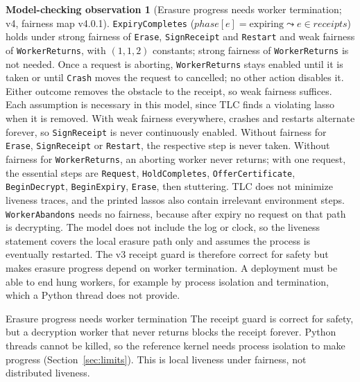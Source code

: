 \documentclass[pdflatex,sn-mathphys-num,twocolumn]{sn-jnl}
\theoremstyle{plain}
\theoremstyle{definition}
\newtheorem{observation}{Model-checking observation}
\newcommand{\code}[1]{\texttt{#1}}
\begin{document}
\begin{observation}[Erasure progress needs worker termination; v4, fairness map v4.0.1]\label{obs:liveness}
\code{ExpiryCompletes} ($\mathit{phase}[e]=\text{expiring}\leadsto e\in\mathit{receipts}$) holds under strong fairness of \code{Erase}, \code{SignReceipt} and \code{Restart} and weak fairness of \code{WorkerReturns}, with $(1,1,2)$ constants; strong fairness of \code{WorkerReturns} is not needed. Once a request is aborting, \code{WorkerReturns} stays enabled until it is taken or until \code{Crash} moves the request to cancelled; no other action disables it. Either outcome removes the obstacle to the receipt, so weak fairness suffices. Each assumption is necessary in this model, since TLC finds a violating lasso when it is removed. With weak fairness everywhere, crashes and restarts alternate forever, so \code{SignReceipt} is never continuously enabled. Without fairness for \code{Erase}, \code{SignReceipt} or \code{Restart}, the respective step is never taken. Without fairness for \code{WorkerReturns}, an aborting worker never returns; with one request, the essential steps are \code{Request}, \code{HoldCompletes}, \code{OfferCertificate}, \code{BeginDecrypt}, \code{BeginExpiry}, \code{Erase}, then stuttering. TLC does not minimize liveness traces, and the printed lassos also contain irrelevant environment steps. \code{WorkerAbandons} needs no fairness, because after expiry no request on that path is decrypting. The model does not include the log or clock, so the liveness statement covers the local erasure path only and assumes the process is eventually restarted. The v3 receipt guard is therefore correct for safety but makes erasure progress depend on worker termination. A deployment must be able to end hung workers, for example by process isolation and termination, which a Python thread does not provide.
\end{observation}

\begin{warnbox}{Erasure progress needs worker termination}
The receipt guard is correct for safety, but a decryption worker that never returns blocks the receipt forever. Python threads cannot be killed, so the reference kernel needs process isolation to make progress (Section~\ref{sec:limits}). This is local liveness under fairness, not distributed liveness.
\end{warnbox}
\end{document}
